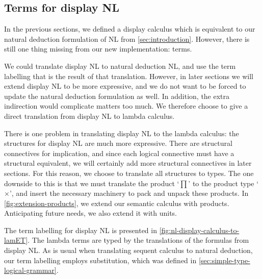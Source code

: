 \subsection{Terms for display NL}
\label{sec:translation-to-lamET}


In the previous sections, we defined a display calculus which is
equivalent to our natural deduction formulation of NL from
\autoref{sec:introduction}. However, there is still one thing missing
from our new implementation: terms.

We could translate display NL to natural deduction NL, and use the
term labelling that is the result of that translation. However, in
later sections we will extend display NL to be more expressive, and we
do not want to be forced to update the natural deduction formulation
as well. In addition, the extra indirection would complicate matters
too much. We therefore choose to give a direct translation from
display NL to lambda calculus.



There is one problem in translating display NL to the lambda
calculus: the structures for display NL are much more expressive. There
are structural connectives for implication, and since each logical
connective must have a structural equivalent, we will certainly add
more structural connectives in later sections. For this reason, we
choose to translate all structures to types. The one downside to this
is that we must translate the product `$\prod$' to the product type
`$\times$', and insert the necessary machinery to pack and unpack
these products.
In \autoref{fig:extension-products}, we extend our semantic calculus
with products. Anticipating future needs, we also extend it with
units.

The term labelling for display NL is presented in
\autoref{fig:nl-display-calculus-to-lamET}. The lambda terms are
typed by the translations of the  formulas from display NL. As is
usual when translating sequent calculus to natural deduction, our term
labelling employs substitution, which was defined in
\autoref{sec:simple-type-logical-grammar}.

\vspace*{1\baselineskip}


